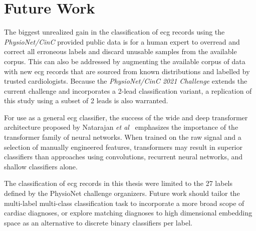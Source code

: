 \documentclass[\main/thesis.tex]{subfiles}
\begin{document}
\section{Future Work}
The biggest unrealized gain in the classification of \gls{ecg} records using the \emph{PhysioNet/CinC} provided public data is for a human expert to overread and correct all erroneous labels and discard unusable samples from the available corpus.
This can also be addressed by augmenting the available corpus of data with new \gls{ecg} records that are sourced from known distributions and labelled by trusted cardiologists.
Because the \emph{PhysioNet/CinC 2021 Challenge} extends the current challenge and incorporates a 2-lead classification variant, a replication of this study using a subset of 2 leads is also warranted.

For use as a general \gls{ecg} classifier, the success of the wide and deep transformer architecture proposed by Natarajan \emph{et al}~\cite{natarajan2020CINC-multilabel-ECG} emphasizes the importance of the transformer family of neural networks.
When trained on the raw signal and a selection of manually engineered features, transformers may result in superior classifiers than approaches using convolutions, recurrent neural networks, and shallow classifiers alone.

The classification of \gls{ecg} records in this thesis were limited to the 27 labels defined by the PhysioNet challenge organizers.
Future work should tailor the multi-label multi-class classification task to incorporate a more broad scope of cardiac diagnoses, or explore matching diagnoses to high dimensional embedding space as an alternative to discrete binary classifiers per label.
\end{document}
